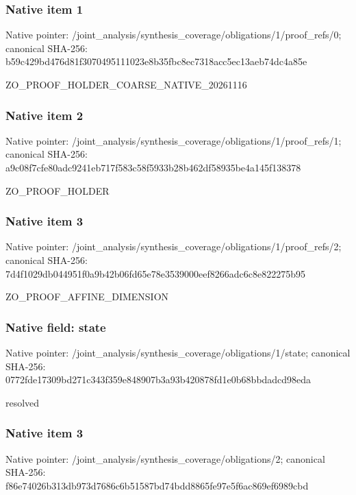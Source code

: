 \documentclass[10pt,a4paper]{article}
\begin{document}
\subsubsection{Native item 1}
Native pointer: /joint\_\allowbreak{}analysis/synthesis\_\allowbreak{}coverage/obligations/1/proof\_\allowbreak{}refs/0; canonical SHA-256: b59c429bd476d81f3070495111023e8b35fbc8ec7318acc5ec13aeb74dc4a85e

\begingroup\raggedright\sloppy ZO\_\allowbreak{}PROOF\_\allowbreak{}HOLDER\_\allowbreak{}COARSE\_\allowbreak{}NATIVE\_\allowbreak{}20261116\par\endgroup

\subsubsection{Native item 2}
Native pointer: /joint\_\allowbreak{}analysis/synthesis\_\allowbreak{}coverage/obligations/1/proof\_\allowbreak{}refs/1; canonical SHA-256: a9c08f7cfe80adc9241eb717f583c58f5933b28b462df58935be4a145f138378

\begingroup\raggedright\sloppy ZO\_\allowbreak{}PROOF\_\allowbreak{}HOLDER\par\endgroup

\subsubsection{Native item 3}
Native pointer: /joint\_\allowbreak{}analysis/synthesis\_\allowbreak{}coverage/obligations/1/proof\_\allowbreak{}refs/2; canonical SHA-256: 7d4f1029db044951f0a9b42b06fd65e78e3539000eef8266adc6c8e822275b95

\begingroup\raggedright\sloppy ZO\_\allowbreak{}PROOF\_\allowbreak{}AFFINE\_\allowbreak{}DIMENSION\par\endgroup

\subsubsection{Native field: state}
Native pointer: /joint\_\allowbreak{}analysis/synthesis\_\allowbreak{}coverage/obligations/1/state; canonical SHA-256: 0772fde17309bd271c343f359e848907b3a93b420878fd1e0b68bbdadcd98eda

\begingroup\raggedright\sloppy resolved\par\endgroup

\subsubsection{Native item 3}
Native pointer: /joint\_\allowbreak{}analysis/synthesis\_\allowbreak{}coverage/obligations/2; canonical SHA-256: f86e74026b313db973d7686c6b51587bd74bdd8865fe97e5f6ac869ef6989cbd
\end{document}
